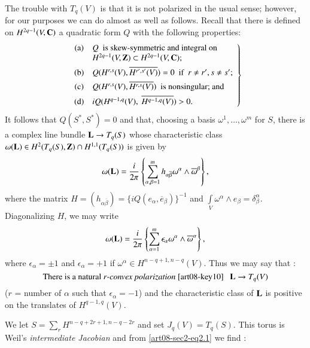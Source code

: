 The trouble with $T_{q}(V)$ is that it is not polarized in the usual sense; however, for our purposes we can do almost as well as follows. Recall \cite{art08-key23} that there is defined on $H^{2q-1}(V,\mathbf{C})$ a quadratic form $Q$ with the following properties:
\setcounter{equation}{0}
\begin{equation}
\left.
\begin{array}{cl}
{\rm(a)} & Q \text{~ is skew-symmetric and integral on ~}\\
         & H^{2q-1}(V,\mathbf{Z})\subset H^{2q-1}(V,\mathbf{C});\\[4pt]
{\rm(b)} & Q(H^{r,s}(V),\overline{H^{r',s'}(V)})=0\text{~ if~ } r\neq r', s\neq s';\\[4pt]
{\rm(c)} & Q(H^{r,s}(V),\overline{H^{r,s}(V)})\text{~ is nonsingular; and}\\[4pt]
{\rm(d)} & iQ(H^{q-1,q}(V), \ \overline{H^{q-1,q}(V)})>0.
\end{array}
\right\}\label{art08-sec2-eq2.1}
\end{equation}
It follows that $Q(S^{*},S^{*})=0$ and that, choosing a basis $\omega^{1},\ldots,\omega^{m}$ for $S$, there is a complex line bundle $\mathbf{L}\to T_{q}(S)$ whose characteristic class $\omega(\mathbf{L})\in H^{2}(T_{q}(S),\mathbf{Z})\cap H^{1,1}(T_{q}(S))$ is given by
$$
\omega(\mathbf{L})=\dfrac{i}{2\pi}\left\{\sum\limits^{m}_{\alpha,\beta=1}h_{\alpha\overline{\beta}}\omega^{\alpha}\wedge \overline{\omega}^{\beta}\right\},
$$
where the matrix $H=(h_{\alpha\overline{\beta}})=\{iQ(e_{\alpha},\overline{e}_{\beta})\}^{-1}$ and $\int\limits_{V}\omega^{\alpha}\wedge e_{\beta}=\delta^{\alpha}_{\beta}$. Diagonalizing $H$, we may write
\begin{equation}
\omega(\mathbf{L})=\dfrac{i}{2\pi}\left\{\sum\limits^{m}_{\alpha=1}\epsilon_{\alpha}\omega^{\alpha}\wedge \overline{\omega}^{\alpha}\right\},\label{art08-sec2-eq2.2}
\end{equation}
where $\epsilon_{\alpha}=\pm 1$ and $\epsilon_{\alpha}=+1$ if $\omega^{\alpha}\in H^{n-q+1,n-q}(V)$. Thus we may say that :
\begin{equation}
\text{There is a natural } r\text{-{\em convex polarization} \cite{art08-key10}~~ } \mathbf{L}\to T_{q}(V)\label{art08-sec2-eq2.3}
\end{equation}\pageoriginale
($r$ = number of $\alpha$ such that $\epsilon_{\alpha}=-1$) and the characteristic class of $\mathbf{L}$ is positive on the translates of $H^{q-1,q}(V)$.

\begin{example}
We let $S=\sum\limits_{r} H^{n-q+2r+1,n-q-2r}$ and set $J_{q}(V)=T_{q}(S)$. This torus is Weil's {\em intermediate Jacobian} \cite{art08-key22} and from \eqref{art08-sec2-eq2.1} we find :
\end{example}

